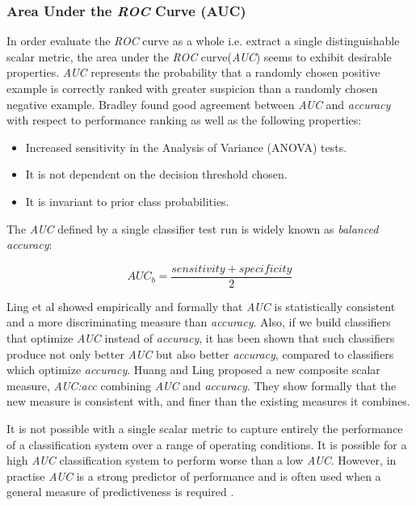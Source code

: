 \documentclass[10pt]{unbthesis}
\begin{document}
\subsubsection{Area Under the \textit{ROC} Curve (AUC)}
In order evaluate the \textit{ROC} curve as a whole i.e. extract a
single distinguishable scalar metric, the area under the \textit{ROC}
curve(\textit{AUC}) seems to exhibit desirable
properties. \textit{AUC} represents the probability that a randomly
chosen positive example is correctly ranked with greater suspicion
than a randomly chosen negative example. Bradley \cite{RefWorks:32} found good
agreement between \textit{AUC} and \textit{accuracy} with respect to
performance ranking as well as the following properties:

\begin{itemize}
\item Increased sensitivity in the Analysis of Variance (ANOVA) tests.
\item It is not dependent on the decision threshold chosen.
\item It is invariant to prior class probabilities.
\end{itemize}

The \textit{AUC} defined by a single classifier test run is widely
known as \textit{balanced accuracy}:

\begin{equation}
  AUC_b = \frac{sensitivity + specificity}{2}
\end{equation}

Ling et al \cite{RefWorks:56} showed empirically and formally that
\textit{AUC} is statistically consistent and a more discriminating measure
than \textit{accuracy}. Also, if we build classifiers that optimize
\textit{AUC} instead of \textit{accuracy}, it has been shown
\cite{RefWorks:62} that such classifiers produce not only better
\textit{AUC} but also better \textit{accuracy}, compared to
classifiers which optimize \textit{accuracy}. Huang and Ling
\cite{RefWorks:42} proposed a new composite scalar measure,
\textit{AUC:acc} combining \textit{AUC} and \textit{accuracy}. They
show formally that the new measure is consistent with, and finer than
the existing measures it combines.

It is not possible with a single scalar metric to capture
entirely the performance of a classification system over a range of
operating conditions. It is possible for a high \textit{AUC}
classification system to perform worse than a low
\textit{AUC}. However, in practise \textit{AUC} is a strong
predictor of performance and is often used when a general measure of
predictiveness is required \cite{RefWorks:39}.
\end{document}
